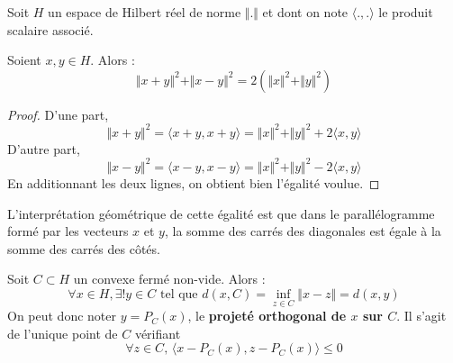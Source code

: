 




	Soit $H$ un espace de Hilbert réel de norme $\Vert . \Vert$ et dont on note $\langle ., . \rangle$ le produit scalaire associé.

	\begin{lemma}
		\label{projection-sur-un-convexe-ferme-1}
		Soient $x, y \in H$. Alors :
		\[ \Vert x + y \Vert^2 + \Vert x - y \Vert^2 = 2(\Vert x \Vert^2 + \Vert y \Vert^2) \]
	\end{lemma}

	\begin{proof}
		D'une part,
		\[ \Vert x + y \Vert^2 = \langle x + y, x + y \rangle = \Vert x \Vert^2 + \Vert y \Vert^2 + 2 \langle x, y \rangle \]
		D'autre part,
		\[ \Vert x - y \Vert^2 = \langle x - y, x - y \rangle = \Vert x \Vert^2 + \Vert y \Vert^2 - 2 \langle x, y \rangle \]
		En additionnant les deux lignes, on obtient bien l'égalité voulue.
	\end{proof}

	\begin{remark}
		L'interprétation géométrique de cette égalité est que dans le parallélogramme formé par les vecteurs $x$ et $y$, la somme des carrés des diagonales est égale à la somme des carrés des côtés.
	\end{remark}


	\begin{theorem}
		\label{projection-sur-un-convexe-ferme-2}
		Soit $C \subset H$ un convexe fermé non-vide. Alors :
		\[ \forall x \in H, \exists! y \in C \text{ tel que } d(x, C) = \inf_{z \in C} \Vert x - z \Vert = d(x, y) \]
		On peut donc noter $y = P_C(x)$, le \textbf{projeté orthogonal de $x$ sur $C$}. Il s'agit de l'unique point de $C$ vérifiant
		\[ \forall z \in C, \, \langle x - P_C(x), z - P_C(x) \rangle \leq 0 \tag{$*$} \]
	\end{theorem}

